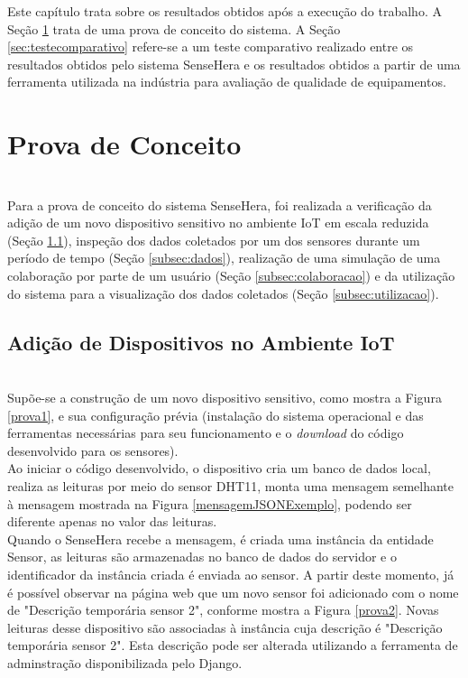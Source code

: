 
\quad Este capítulo trata sobre os resultados obtidos após a execução do trabalho. A Seção \ref{sec:provadeconceito} trata de uma prova de conceito do sistema. A Seção \ref{sec:testecomparativo} refere-se a um teste comparativo realizado entre os resultados obtidos pelo sistema SenseHera e os resultados obtidos a partir de uma ferramenta utilizada na indústria para avaliação de qualidade de equipamentos.
%
\section{Prova de Conceito}
\label{sec:provadeconceito}
\\\null \quad Para a prova de conceito do sistema SenseHera, foi realizada a verificação da adição de um novo dispositivo sensitivo no ambiente \acrshort{IoT} em escala reduzida (Seção \ref{subsec:dispositivo}), inspeção dos dados coletados por um dos sensores durante um período de tempo (Seção \ref{subsec:dados}), realização de uma simulação de uma colaboração por parte de um usuário (Seção \ref{subsec:colaboracao}) e da utilização do sistema para a visualização dos dados coletados (Seção \ref{subsec:utilizacao}).

\subsection{Adição de Dispositivos no Ambiente IoT}
\label{subsec:dispositivo}
\\\null \quad Supõe-se a construção de um novo dispositivo sensitivo, como mostra a Figura \ref{prova1}, e sua configuração prévia (instalação do sistema operacional e das ferramentas necessárias para seu funcionamento e o \textit{download} do código desenvolvido para os sensores).
\pagebreak
{}
\\\null \quad Ao iniciar o código desenvolvido, o dispositivo cria um banco de dados local, realiza as leituras por meio do sensor DHT11, monta uma mensagem semelhante à mensagem mostrada na Figura \ref{mensagemJSONExemplo}, podendo ser diferente apenas no valor das leituras.
\\\null \quad Quando o SenseHera recebe a mensagem, é criada uma instância da entidade Sensor, as leituras são armazenadas no banco de dados do servidor e o identificador da instância criada é enviada ao sensor. A partir deste momento, já é possível observar na página web que um novo sensor foi adicionado com o nome de "Descrição temporária sensor 2", conforme mostra a Figura \ref{prova2}. Novas leituras desse dispositivo são associadas à instância cuja descrição é "Descrição temporária sensor 2". Esta descrição pode ser alterada utilizando a ferramenta de adminstração disponibilizada pelo Django.
\pagebreak
{}

